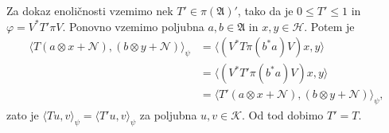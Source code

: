 \begin{dokaz}
    Za dokaz enoličnosti vzemimo nek $T' \in \pi(\mathfrak{A})'$, tako da je $0 \leq T' \leq 1$ in $\varphi = V^* T' \pi V$.
    Ponovno vzemimo poljubna $a, b \in \mathfrak{A}$ in $x, y \in \mathcal{H}$. Potem je 
    \begin{align*}
        \langle T (a \otimes x + \mathcal{N}), (b \otimes y + \mathcal{N}) \rangle _{\psi} &= \langle (V^* T \pi(b^* a) V) x, y\rangle\\
        &= \langle (V^* T' \pi(b^* a) V) x, y\rangle\\
        &= \langle T' (a \otimes x + \mathcal{N}), (b \otimes y + \mathcal{N}) \rangle _{\psi},
    \end{align*}
    zato je $\langle Tu, v \rangle_{\psi} = \langle T' u, v\rangle_{\psi}$ za poljubna $u, v \in \mathcal{K}$.
    Od tod dobimo $T' = T$.
\end{dokaz}



